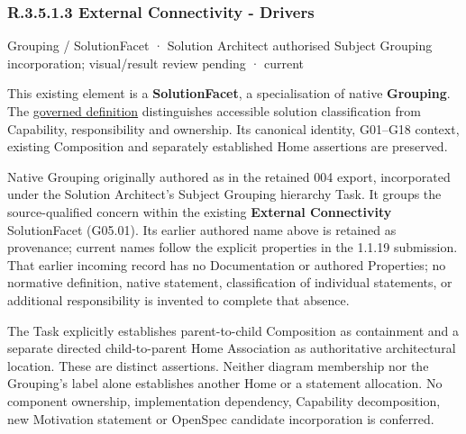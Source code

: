 \subsubsection*{R.3.5.1.3 External Connectivity - Drivers}
\label{navigation:R.3.5.1.3}

\label{element:3f830af6837d4f89bcd042039572bcdc}
{\small Grouping / SolutionFacet · Solution Architect authorised Subject Grouping incorporation; visual/result review pending · current}\par

This existing element is a \textbf{SolutionFacet}, a specialisation of native
\textbf{Grouping}. The \href{\detokenize{../../../../../../../governance/continuum-representation.md#solutionfacet-classification--1119-candidate}}{governed definition}
distinguishes accessible solution classification from Capability, responsibility
and ownership. Its canonical identity, G01–G18 context, existing Composition
and separately established Home assertions are preserved.



Native Grouping originally authored as \texttt{} in the retained 004 export,
incorporated under the Solution Architect's Subject Grouping hierarchy Task.
It groups the source-qualified \texttt{} concern within
the existing \textbf{External Connectivity} SolutionFacet (G05.01). Its earlier authored name above is retained as provenance; current names
follow the explicit properties in the 1.1.19 submission.
That earlier incoming record has no Documentation or authored Properties; no normative
definition, native statement, classification of individual statements, or
additional responsibility is invented to complete that absence.



The Task explicitly establishes parent-to-child Composition as containment and
a separate directed child-to-parent Home Association as authoritative architectural
location. These are distinct assertions. Neither diagram membership nor the
Grouping's label alone establishes another Home or a statement allocation.
No component ownership, implementation dependency, Capability decomposition,
new Motivation statement or OpenSpec candidate incorporation is conferred.



